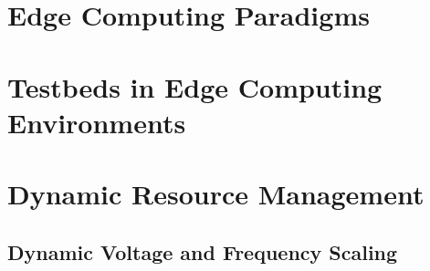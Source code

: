 \section{Edge Computing Paradigms}


\section{Testbeds in Edge Computing Environments}

\section{Dynamic Resource Management}

\subsection{Dynamic Voltage and Frequency Scaling}

